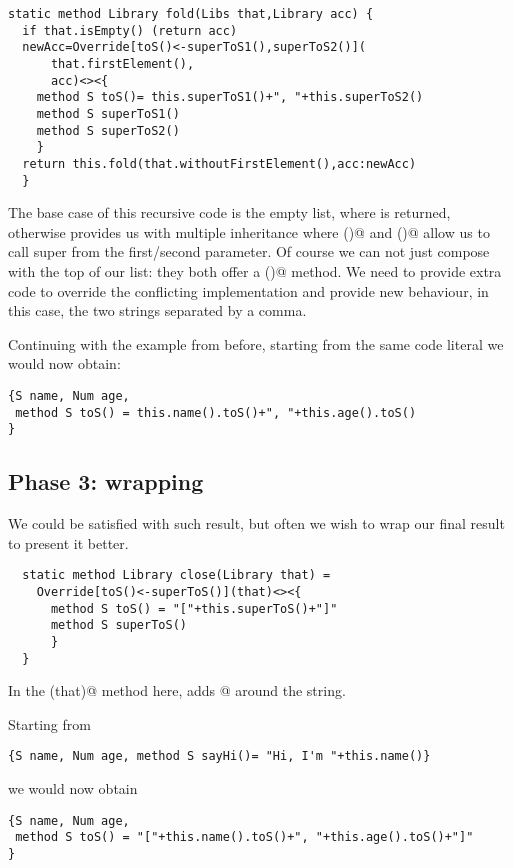 \begin{lstlisting}
static method Library fold(Libs that,Library acc) {
  if that.isEmpty() (return acc)
  newAcc=Override[toS()<-superToS1(),superToS2()](
      that.firstElement(),
      acc)<><{
    method S toS()= this.superToS1()+", "+this.superToS2()
    method S superToS1()
    method S superToS2()
    }
  return this.fold(that.withoutFirstElement(),acc:newAcc)
  }
\end{lstlisting}

The base case of this recursive code is the empty list, where \Q@acc@ is returned,
otherwise \Q@Override@ provides us with multiple inheritance where
()@ and ()@
allow us to call super from the first/second parameter.
Of course we can not just compose \Q@acc@ with the top of our list: they both offer
a \Q@toS()@ method. We need to provide extra code to override the conflicting implementation
and provide new behaviour, in this case, the two strings separated by a comma.

\noindent
Continuing with the example from before, starting from the same code literal we would now obtain:

\begin{lstlisting}
{S name, Num age,
 method S toS() = this.name().toS()+", "+this.age().toS()
}
\end{lstlisting}

\subsection*{Phase 3: wrapping}
We could be satisfied with such result, but often we wish to wrap our final result
to present it better.

\begin{lstlisting}
  static method Library close(Library that) =
    Override[toS()<-superToS()](that)<><{
      method S toS() = "["+this.superToS()+"]"
      method S superToS()
      }
  }
\end{lstlisting}

\noindent
  In the \Q@close(that)@ method here, \Q@Override@ adds \Q@[]@ around the string.

\noindent
Starting from

\begin{lstlisting}
{S name, Num age, method S sayHi()= "Hi, I'm "+this.name()}
\end{lstlisting}

\noindent
we would now obtain

\begin{lstlisting}
{S name, Num age,
 method S toS() = "["+this.name().toS()+", "+this.age().toS()+"]"
}
\end{lstlisting}

